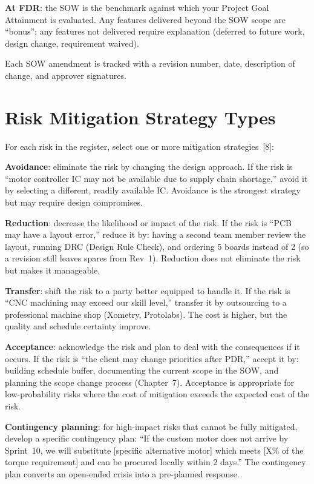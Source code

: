 \textbf{At FDR}: the SOW is the benchmark against which your Project Goal Attainment is evaluated. Any features delivered beyond the SOW scope are ``bonus''; any features not delivered require explanation (deferred to future work, design change, requirement waived).

Each SOW amendment is tracked with a revision number, date, description of change, and approver signatures.



\section{Risk Mitigation Strategy Types}
For each risk in the register, select one or more mitigation strategies~[8]:

\textbf{Avoidance}: eliminate the risk by changing the design approach. If the risk is ``motor controller IC may not be available due to supply chain shortage,'' avoid it by selecting a different, readily available IC. Avoidance is the strongest strategy but may require design compromises.

\textbf{Reduction}: decrease the likelihood or impact of the risk. If the risk is ``PCB may have a layout error,'' reduce it by: having a second team member review the layout, running DRC (Design Rule Check), and ordering 5 boards instead of 2 (so a revision still leaves spares from Rev~1). Reduction does not eliminate the risk but makes it manageable.

\textbf{Transfer}: shift the risk to a party better equipped to handle it. If the risk is ``CNC machining may exceed our skill level,'' transfer it by outsourcing to a professional machine shop (Xometry, Protolabs). The cost is higher, but the quality and schedule certainty improve.

\textbf{Acceptance}: acknowledge the risk and plan to deal with the consequences if it occurs. If the risk is ``the client may change priorities after PDR,'' accept it by: building schedule buffer, documenting the current scope in the SOW, and planning the scope change process (Chapter~7). Acceptance is appropriate for low-probability risks where the cost of mitigation exceeds the expected cost of the risk.

\textbf{Contingency planning}: for high-impact risks that cannot be fully mitigated, develop a specific contingency plan: ``If the custom motor does not arrive by Sprint~10, we will substitute [specific alternative motor] which meets [X\% of the torque requirement] and can be procured locally within 2 days.'' The contingency plan converts an open-ended crisis into a pre-planned response.



